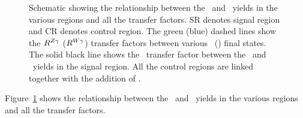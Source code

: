 \begin{figure}[htbp]
  \centering
  \caption{
    Schematic showing the relationship between the \PZ\Pgg\ and \PW\Pgg\ yields in the various regions and all the transfer factors.
    SR denotes signal region and CR denotes control region.
    The green (blue) dashed lines show the $R^{{Z}\gamma}$ ($R^{{W}\gamma}$) transfer factors between various \PZ\Pgg\ (\PW\Pgg) final states.
    The solid black line shows the \fZW\ transfer factor between the \zinvg\ and \wlng\ yields in the signal region.
    All the control regions are linked together with the addition of \fZW.
    }
    \label{fig:transfer_factors}
\end{figure}

Figure~\ref{fig:transfer_factors} shows the relationship between the \zinvg\ and \wlng\ yields in the various regions and all the transfer factors.
